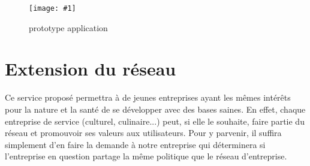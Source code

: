 \documentclass{report}
\newcommand{\iImage}[3]{\begin{figure}[H]\centering\texttt{[image: \#1]}\caption{#2}\end{figure}}
\newcommand{\n}{\newline}
\begin{document}
\iImage{Images/application2.png}{prototype application}{0.18}

\section{Extension du réseau}

Ce service proposé permettra à de jeunes entreprises ayant les mêmes intérêts pour la nature et la santé de se développer avec des bases saines.
En effet, chaque entreprise de service (culturel, culinaire...) peut, si elle le souhaite, faire partie du réseau et promouvoir ses valeurs aux utilisateurs. \n
Pour y parvenir, il suffira simplement d'en faire la demande à notre entreprise qui déterminera si l'entreprise en question partage la même politique que le réseau d'entreprise.
\end{document}
